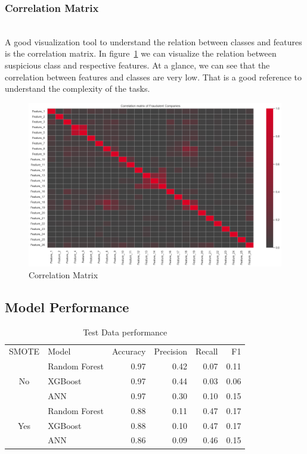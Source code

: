 \subsubsection{Correlation Matrix}\hspace*{\fill} \\
A good visualization tool to understand the relation between classes and features is the correlation matrix. In figure~\ref{fig:corr} we can visualize the relation between suspicious class and respective features. At a glance, we can see that the correlation between features and classes are very low. That is a good reference to understand the complexity of the tasks. 
\begin{figure}[H]
    \centering
    \includegraphics[width=\linewidth]{figures/corr.png}
    \caption{Correlation Matrix}
    \label{fig:corr}
\end{figure}

\subsection{Model Performance}
\begin{table}[H]
\begin{tabular}{clrrrr}
\cline{2-6}
\multicolumn{1}{l}{SMOTE} & Model         & \multicolumn{1}{l}{Accuracy} & \multicolumn{1}{l}{Precision} & \multicolumn{1}{l}{Recall} & F1 \\ \cline{2-6} 
\multirow{3}{*}{No}       & Random Forest &0.97  & 0.42  & 0.07  & 0.11 \\
                          & XGBoost       &0.97  & 0.44  & 0.03  & 0.06 \\
                          & ANN           &0.97  & 0.30  & 0.10  & 0.15 \\ \cline{2-6} 
\multirow{3}{*}{Yes}       & Random Forest &0.88  & 0.11  & 0.47  & 0.17 \\
                          & XGBoost       &0.88  & 0.10  & 0.47  & 0.17 \\
                          & ANN           &0.86  & 0.09  & 0.46  & 0.15 \\ \cline{2-6} 
\end{tabular}
\label{tab:performance_test_set}
\caption{Test Data performance}
\end{table}


